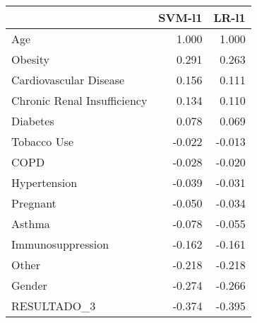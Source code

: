 \begin{tabular}{lrr}
\toprule
{} &  SVM-l1 &  LR-l1 \\
\midrule
Age                         &   1.000 &  1.000 \\
Obesity                     &   0.291 &  0.263 \\
Cardiovascular Disease      &   0.156 &  0.111 \\
Chronic Renal Insufficiency &   0.134 &  0.110 \\
Diabetes                    &   0.078 &  0.069 \\
Tobacco Use                 &  -0.022 & -0.013 \\
COPD                        &  -0.028 & -0.020 \\
Hypertension                &  -0.039 & -0.031 \\
Pregnant                    &  -0.050 & -0.034 \\
Asthma                      &  -0.078 & -0.055 \\
Immunosuppression           &  -0.162 & -0.161 \\
Other                       &  -0.218 & -0.218 \\
Gender                      &  -0.274 & -0.266 \\
RESULTADO\_3                 &  -0.374 & -0.395 \\
\bottomrule
\end{tabular}
